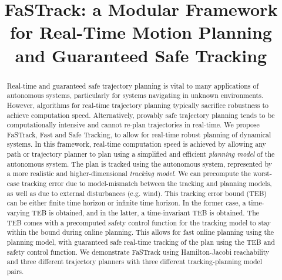 \documentclass[journal]{IEEEtran}
\title{\LARGE \bf FaSTrack: a Modular Framework for Real-Time Motion Planning and Guaranteed Safe Tracking}
\author{}
\begin{document}
\maketitle
\thispagestyle{empty}
\pagestyle{empty}

\begin{abstract}
Real-time and guaranteed safe trajectory planning is vital to many applications of autonomous systems, particularly for systems navigating in unknown environments.
However, algorithms for real-time trajectory planning typically sacrifice robustness to achieve computation speed. 
Alternatively, provably safe trajectory planning tends to be computationally intensive and cannot re-plan trajectories in real-time. 
We propose FaSTrack, Fast and Safe Tracking, to allow for real-time robust planning of dynamical systems. 
In this framework, real-time computation speed is achieved by allowing any path or trajectory planner to plan using a simplified and efficient \textit{planning model} of the autonomous system.  
The plan is tracked using the autonomous system, represented by a more realistic and higher-dimensional \textit{tracking model}. 
We can precompute the worst-case tracking error due to model-mismatch between the tracking and planning models, as well as due to external disturbances (e.g. wind).  
This tracking error bound (TEB) can be either finite time horizon or infinite time horizon.
In the former case, a time-varying TEB is obtained, and in the latter, a time-invariant TEB is obtained.
The TEB comes with a precomputed safety control function for the tracking model to stay within the bound during online planning.  
This allows for fast online planning using the planning model, with guaranteed safe real-time tracking of the plan using the TEB and safety control function.
We demonstrate FaSTrack using Hamilton-Jacobi reachability and three different trajectory planners with three different tracking-planning model pairs.
\end{abstract}
\end{document}
